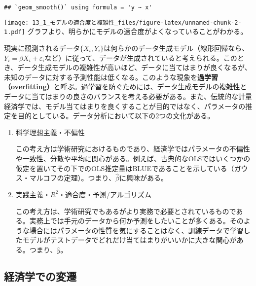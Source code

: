 \documentclass[
  pandoc,
  jafont=haranoaji]{bxjsarticle}
\begin{document}
\begin{verbatim}
## `geom_smooth()` using formula = 'y ~ x'
\end{verbatim}

\texttt{[image: 13\_1\_モデルの適合度と複雑性\_files/figure-latex/unnamed-chunk-2-1.pdf]}
グラフより、明らかにモデルの適合度がよくなっていることがわかる。

現実に観測されるデータ\(\{X_i, Y_i\}\)は何らかのデータ生成モデル（線形回帰なら、\(Y_i = \beta X_i+\varepsilon_i\)など）に従って、データが生成されていると考えられる。このとき、データ生成モデルの複雑性が高いほど、データに当てはまりが良くなるが、未知のデータに対する予測性能は低くなる。このような現象を\textbf{過学習（overfitting）}と呼ぶ。過学習を防ぐためには、データ生成モデルの複雑性とデータに当てはまりの良さのバランスを考える必要がある。また、伝統的な計量経済学では、モデル当てはまりを良くすることが目的ではなく、パラメータの推定を目的としている。データ分析において以下の2つの文化がある。

\begin{enumerate}
\def\labelenumi{\arabic{enumi}.}
\item
  科学理想主義・不偏性

  この考え方は学術研究におけるものであり、経済学ではパラメータの不偏性や一致性、分散や平均に関心がある。例えば、古典的なOLSではいくつかの仮定を置いてその下でのOLS推定量はBLUEであることを示している（ガウス・マルコフの定理）。つまり、\(\hat{\beta}\)に興味がある。
\item
  実践主義・\(R^2\)・適合度・予測/アルゴリズム

  この考え方は、学術研究でもあるがより実務で必要とされているものである。実務上では手元のデータから何か予測をしたいことが多くある。そのような場合にはパラメータの性質を気にすることはなく、訓練データで学習したモデルがテストデータでどれだけ当てはまりがいいかに大きな関心がある。つまり、\(\hat{y}\)。
\end{enumerate}

\hypertarget{ux7d4cux6e08ux5b66ux3067ux306eux5909ux9077}{%
\subsection{経済学での変遷}\label{ux7d4cux6e08ux5b66ux3067ux306eux5909ux9077}}
\end{document}
